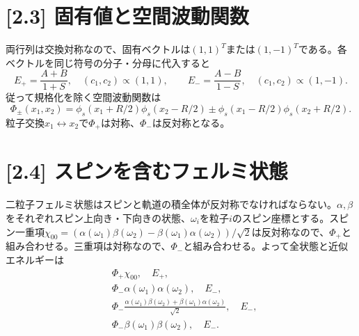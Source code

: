 \documentclass[11pt,a4paper]{article}
\begin{document}
\section*{[2.3] 固有値と空間波動関数}
両行列は交換対称なので、固有ベクトルは$(1,1)^T$または$(1,-1)^T$である。各ベクトルを同じ符号の分子・分母に代入すると
\begin{equation}
 E_+=\frac{A+B}{1+S},\quad (c_1,c_2)\propto(1,1),\qquad
 E_-=\frac{A-B}{1-S},\quad (c_1,c_2)\propto(1,-1).
\end{equation}
従って規格化を除く空間波動関数は
\begin{equation}
 \boxed{\Phi_\pm(x_1,x_2)=\phi_s(x_1+R/2)\phi_s(x_2-R/2)
 \pm\phi_s(x_1-R/2)\phi_s(x_2+R/2)}.
\end{equation}
粒子交換$x_1\leftrightarrow x_2$で$\Phi_+$は対称、$\Phi_-$は反対称となる。

\section*{[2.4] スピンを含むフェルミ状態}
二粒子フェルミ状態はスピンと軌道の積全体が反対称でなければならない。$\alpha,\beta$をそれぞれスピン上向き・下向きの状態、$\omega_i$を粒子$i$のスピン座標とする。スピン一重項$\chi_{00}=(\alpha(\omega_1)\beta(\omega_2)-\beta(\omega_1)\alpha(\omega_2))/\sqrt2$は反対称なので、$\Phi_+$と組み合わせる。三重項は対称なので、$\Phi_-$と組み合わせる。よって全状態と近似エネルギーは
\begin{align}
 &\boxed{\Phi_+\chi_{00},\quad E_+},\\
 &\boxed{\Phi_-\alpha(\omega_1)\alpha(\omega_2),\quad E_-},\\
 &\boxed{\Phi_-\frac{\alpha(\omega_1)\beta(\omega_2)+\beta(\omega_1)\alpha(\omega_2)}{\sqrt2},\quad E_-},\\
 &\boxed{\Phi_-\beta(\omega_1)\beta(\omega_2),\quad E_-}.
\end{align}
\end{document}
